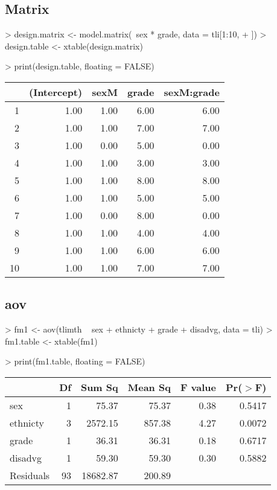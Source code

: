 \documentclass[letterpaper]{article}
\begin{document}
\subsection{Matrix}
\begin{Schunk}
\begin{Sinput}
> design.matrix <- model.matrix(~sex * grade, data = tli[1:10, 
+     ])
> design.table <- xtable(design.matrix)
\end{Sinput}
\end{Schunk}
\begin{Schunk}
\begin{Sinput}
> print(design.table, floating = FALSE)
\end{Sinput}
% latex table generated in R 2.6.0 by xtable 1.5-2 package
% Wed Oct 10 14:26:36 2007
\begin{tabular}{rrrrr}
  \hline
 & (Intercept) & sexM & grade & sexM:grade \\
  \hline
1 & 1.00 & 1.00 & 6.00 & 6.00 \\
  2 & 1.00 & 1.00 & 7.00 & 7.00 \\
  3 & 1.00 & 0.00 & 5.00 & 0.00 \\
  4 & 1.00 & 1.00 & 3.00 & 3.00 \\
  5 & 1.00 & 1.00 & 8.00 & 8.00 \\
  6 & 1.00 & 1.00 & 5.00 & 5.00 \\
  7 & 1.00 & 0.00 & 8.00 & 0.00 \\
  8 & 1.00 & 1.00 & 4.00 & 4.00 \\
  9 & 1.00 & 1.00 & 6.00 & 6.00 \\
  10 & 1.00 & 1.00 & 7.00 & 7.00 \\
   \hline
\end{tabular}\end{Schunk}

\subsection{aov}
\begin{Schunk}
\begin{Sinput}
> fm1 <- aov(tlimth ~ sex + ethnicty + grade + disadvg, data = tli)
> fm1.table <- xtable(fm1)
\end{Sinput}
\end{Schunk}
\begin{Schunk}
\begin{Sinput}
> print(fm1.table, floating = FALSE)
\end{Sinput}
% latex table generated in R 2.6.0 by xtable 1.5-2 package
% Wed Oct 10 14:26:36 2007
\begin{tabular}{lrrrrr}
  \hline
 & Df & Sum Sq & Mean Sq & F value & Pr($>$F) \\
  \hline
sex & 1 & 75.37 & 75.37 & 0.38 & 0.5417 \\
  ethnicty & 3 & 2572.15 & 857.38 & 4.27 & 0.0072 \\
  grade & 1 & 36.31 & 36.31 & 0.18 & 0.6717 \\
  disadvg & 1 & 59.30 & 59.30 & 0.30 & 0.5882 \\
  Residuals & 93 & 18682.87 & 200.89 &  &  \\
   \hline
\end{tabular}\end{Schunk}
\end{document}
